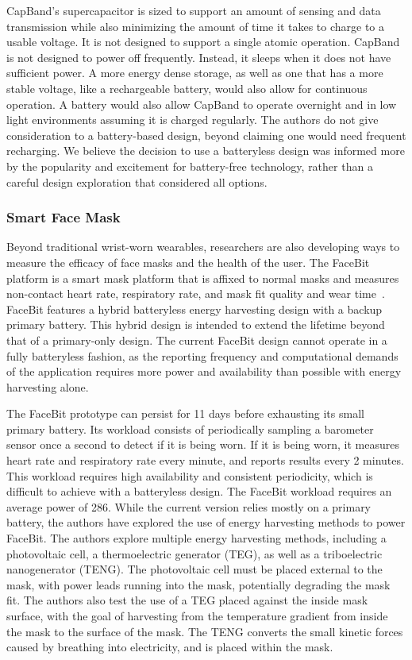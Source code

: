 CapBand's supercapacitor is sized to support an amount of sensing and data transmission while also minimizing the amount of time it takes to charge to a usable voltage. It is not designed to support a single atomic operation. CapBand is not designed to power off frequently. Instead, it sleeps when it does not have sufficient power.
A more energy dense storage, as well as one that has a more stable voltage, like a rechargeable battery, would also allow for continuous operation. A battery would also allow CapBand to operate overnight and in low light environments assuming it is charged regularly.
The authors do not give consideration to a battery-based design, beyond claiming one would need frequent recharging.
We believe the decision to use a batteryless design was informed more by the popularity and excitement for battery-free technology, rather than a careful design exploration that considered all options.

\subsubsection{Smart Face Mask}
Beyond traditional wrist-worn wearables, researchers are also developing ways to measure the efficacy of face masks and the health of the user.
The FaceBit platform is a smart mask platform that is affixed to normal masks and measures non-contact heart rate, respiratory rate, and mask fit quality and wear time~\cite{curtiss2021facebit}.
FaceBit features a hybrid batteryless energy harvesting design with a backup primary battery. This hybrid design is intended to extend the lifetime beyond that of a primary-only design.
The current FaceBit design cannot operate in a fully batteryless fashion, as the reporting frequency and computational demands of the application requires more power and availability than possible with energy harvesting alone.

The FaceBit prototype can persist for 11 days before exhausting its small primary battery.
Its workload consists of periodically sampling a barometer sensor once a second to detect if it is being worn. If it is being worn, it measures  heart rate and respiratory rate every minute, and reports results every 2 minutes.
This workload requires high availability and consistent periodicity, which is difficult to achieve with a batteryless design.
The FaceBit workload requires an average power of 286\ssi{\micro\watt}.
While the current version relies mostly on a primary battery, the authors have explored the use of energy harvesting methods to power FaceBit.
The authors explore multiple energy harvesting methods, including a photovoltaic cell, a thermoelectric generator (TEG), as well as a triboelectric nanogenerator (TENG).
The photovoltaic cell must be placed external to the mask, with power leads running into the mask, potentially degrading the mask fit.
The authors also test the use of a TEG placed against the inside mask surface, with the goal of harvesting from the temperature gradient from inside the mask to the surface of the mask.
The TENG converts the small kinetic forces caused by breathing into electricity, and is placed within the mask.

